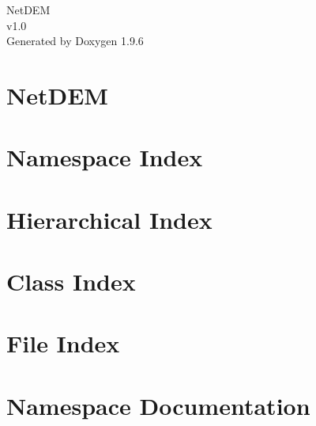 \documentclass[twoside]{book}
\newcommand{\+}{\discretionary{\mbox{\scriptsize$\hookleftarrow$}}{}{}}
\newcommand{\clearemptydoublepage}{%
    \newpage{\pagestyle{empty}\cleardoublepage}%
  }
\begin{document}
  \raggedbottom
    \hypersetup{pageanchor=false,
                bookmarksnumbered=true,
                pdfencoding=unicode
               }
  \begin{titlepage}
  \vspace*{7cm}
  \begin{center}%
  {\Large Net\+DEM}\\
  [1ex]\large v1.\+0 \\
  \vspace*{1cm}
  {\large Generated by Doxygen 1.9.6}\\
  \end{center}
  \end{titlepage}
  \clearemptydoublepage
  \tableofcontents
  \clearemptydoublepage
  \hypersetup{pageanchor=true}
\chapter{Net\+DEM}
\label{index}\hypertarget{index}{}
\chapter{Namespace Index}

\chapter{Hierarchical Index}

\chapter{Class Index}

\chapter{File Index}

\chapter{Namespace Documentation}

\end{document}
